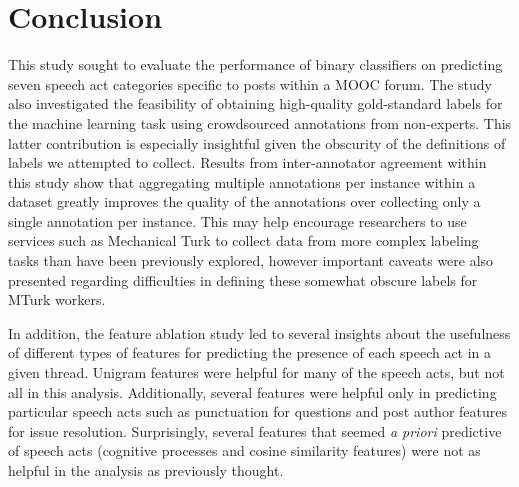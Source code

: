 \documentclass[twoside]{article}
\begin{document}
\section{Conclusion}\label{sec:conclusion}
This study sought to evaluate the performance of binary classifiers on predicting seven speech act categories specific to posts within a MOOC forum. The study also investigated the feasibility of obtaining high-quality gold-standard labels for the machine learning task using crowdsourced annotations from non-experts. This latter contribution is especially insightful given the obscurity of the definitions of labels we attempted to collect. Results from inter-annotator agreement within this study show that aggregating multiple annotations per instance within a dataset greatly improves the quality of the annotations over collecting only a single annotation per instance. This may help encourage researchers to use services such as Mechanical Turk to collect data from more complex labeling tasks than have been previously explored, however important caveats were also presented regarding difficulties in defining these somewhat obscure labels for MTurk workers. 
\par
In addition, the feature ablation study led to several insights about the usefulness of different types of features for predicting the presence of each speech act in a given thread. Unigram features were helpful for many of the speech acts, but not all in this analysis. Additionally, several features were helpful only in predicting particular speech acts such as punctuation for questions and post author features for issue resolution. Surprisingly, several features that seemed \emph{a priori} predictive of speech acts (cognitive processes and cosine similarity features) were not as helpful in the analysis as previously thought.
\par
\end{document}
